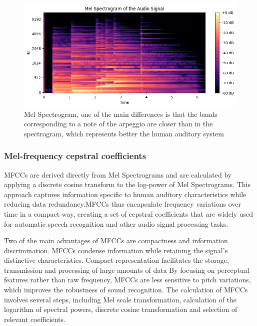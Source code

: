 \documentclass[11pt]{article}
\begin{document}
\begin{figure}[h]
  \centering
  \begin{minipage}{0.9\textwidth}
    \centering
    \includegraphics[width=1\textwidth]{"image/Mel_spectrogram_piano.png"}
    \caption{Mel Spectrogram, one of the main differences is that the bands corresponding to a note of the arpeggio are closer than in the spectrogram, which represents better the human auditory system}
    \label{fig:Mel_spectrogram_piano}
  \end{minipage}\hfill
\end{figure}


\subsubsection{Mel-frequency cepstral coefficients}

MFCCs are derived directly from Mel Spectrograms and are calculated by applying a discrete cosine transform to the log-power of Mel Spectrograms. This approach captures information specific to human auditory characteristics while reducing data redundancy.MFCCs thus encapsulate frequency variations over time in a compact way, creating a set of cepstral coefficients that are widely used for automatic speech recognition and other audio signal processing tasks.

Two of the main advantages of MFCCs are compactness and information discrimination. MFCCs condense information while retaining the signal's distinctive characteristics. Compact representation facilitates the storage, transmission and processing of large amounts of data
By focusing on perceptual features rather than raw frequency, MFCCs are less sensitive to pitch variations, which improves the robustness of sound recognition.
The calculation of MFCCs involves several steps, including Mel scale transformation, calculation of the logarithm of spectral powers, discrete cosine transformation and selection of relevant coefficients.
\end{document}
